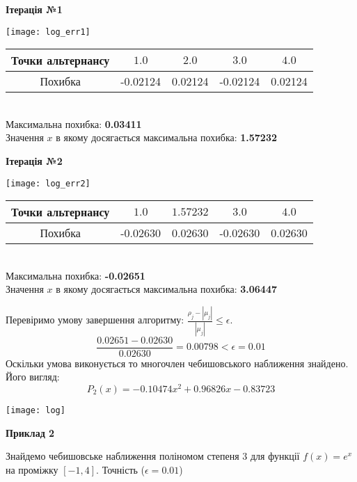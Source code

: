 \documentclass[ukrainian,14pt]{extarticle}
\begin{document}
\begin{center}
\textbf{Ітерація №1}
\end{center}

\texttt{[image: log\_err1]}
\begin{tabular}{|c|c|c|c|c|}
\hline
\rule{0pt}{4ex}
Точки альтернансу & $1.0$ & $2.0$ & $3.0$ & $4.0$ \\ \hline
\rule{0pt}{4ex} 
Похибка & -0.02124 & 0.02124 & -0.02124 & 0.02124  \\ \hline 
\end{tabular}\\

\noindent
Максимальна похибка: \textbf{0.03411}\\
Значення $x$ в якому досягається максимальна похибка: \textbf{1.57232}


\newpage

\begin{center}
\textbf{Ітерація №2}
\end{center}

\texttt{[image: log\_err2]}
\begin{tabular}{|c|c|c|c|c|}
\hline
\rule{0pt}{4ex} 
Точки альтернансу & $1.0$ & $1.57232$ & $3.0$ & $4.0$ \\ \hline
\rule{0pt}{4ex} 
Похибка & -0.02630 & 0.02630 & -0.02630 & 0.02630   \\ \hline 
\end{tabular}\\

\noindent
Максимальна похибка: \textbf{-\textsc{0.02651}}\\
Значення $x$ в якому досягається максимальна похибка: \textbf{3.06447}

\newpage

Перевіримо умову завершення алгоритму: $\frac{\rho_j - |\mu_j|}{|\mu_j|} \leq \epsilon.$ \\

$$\frac{0.02651 - 0.02630}{0.02630} = 0.00798 < \epsilon = 0.01$$
Оскільки умова виконується  то многочлен чебишовського наближення знайдено. Його вигляд:\\
$$P_2(x) = -0.10474 x^{2} + 0.96826x - 0.83723$$

\texttt{[image: log]}

\newpage


\textbf{Приклад 2} 	

Знайдемо чебишовське наближення поліномом степеня 3 для функції $f(x) = e^{x}$ на проміжку $[-1, 4]$. Точність ($\epsilon = 0.01$)
\end{document}
